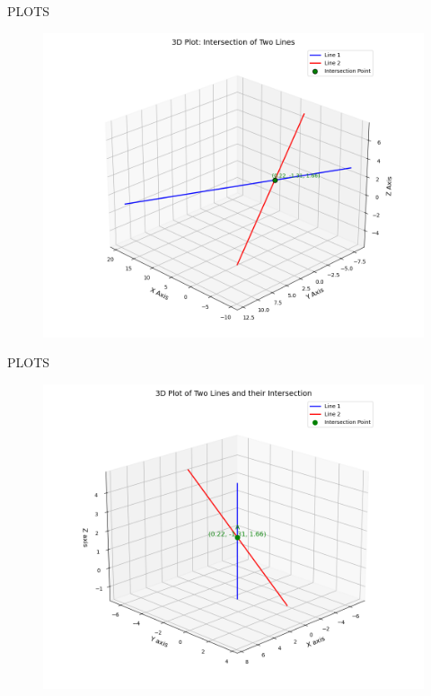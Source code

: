 \documentclass{beamer}
\begin{document}
\begin{frame}{PLOTS}
    \begin{figure}
        \centering
        \includegraphics[width=0.9\columnwidth]{figs/fig71.png}
        \caption{}
        \label{fig:placeholder}
    \end{figure}
\end{frame}
\begin{frame}{PLOTS}
    \begin{figure}
        \centering
        \includegraphics[width=0.9\columnwidth]{figs/fig72.png}
        \caption{}
        \label{fig:placeholder}
    \end{figure}
\end{frame}
\end{document}
